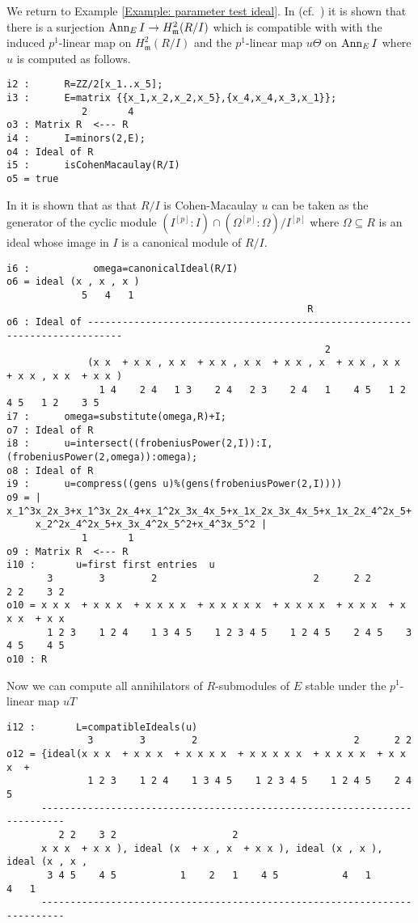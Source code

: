 \documentclass[11pt]{amsart}
\begin{document}
\begin{example}

We return to Example \ref{Example: parameter test ideal}.
In (cf.~\cite[\S 9]{KatzmanParameterTestIdealOfCMRings}) it is shown that
there is a surjection $\operatorname{{Ann}}_E I \rightarrow H^2_{\mathfrak{m}} (R/I)$
which is compatible with with the induced $p^1$-linear map on $H^2_{\mathfrak{m}} (R/I)$
and the $p^1$-linear map $u \Theta$ on $\operatorname{{Ann}}_E I$ where $u$ is computed as follows.
\begin{verbatim}
i2 :      R=ZZ/2[x_1..x_5];
i3 :      E=matrix {{x_1,x_2,x_2,x_5},{x_4,x_4,x_3,x_1}};
             2       4
o3 : Matrix R  <--- R
i4 :      I=minors(2,E);
o4 : Ideal of R
i5 :      isCohenMacaulay(R/I)
o5 = true
\end{verbatim}

In \cite{KatzmanParameterTestIdealOfCMRings} it is shown that as that $R/I$ is Cohen-Macaulay $u$
can be taken as the generator of the cyclic module $(I^{[p]}:I) \cap (\Omega^{[p]}:\Omega)/I^{[p]}$
where $\Omega \subseteq R$ is an ideal whose image in $I$ is a canonical module of $R/I$.


\begin{verbatim}
i6 :           omega=canonicalIdeal(R/I)
o6 = ideal (x , x , x )
             5   4   1
                                                    R
o6 : Ideal of ----------------------------------------------------------------------------
                                                       2
              (x x  + x x , x x  + x x , x x  + x x , x  + x x , x x  + x x , x x  + x x )
                1 4    2 4   1 3    2 4   2 3    2 4   1    4 5   1 2    4 5   1 2    3 5
i7 :      omega=substitute(omega,R)+I;
o7 : Ideal of R
i8 :      u=intersect((frobeniusPower(2,I)):I,(frobeniusPower(2,omega)):omega);
o8 : Ideal of R
i9 :      u=compress((gens u)%(gens(frobeniusPower(2,I))))
o9 = | x_1^3x_2x_3+x_1^3x_2x_4+x_1^2x_3x_4x_5+x_1x_2x_3x_4x_5+x_1x_2x_4^2x_5+
     x_2^2x_4^2x_5+x_3x_4^2x_5^2+x_4^3x_5^2 |
             1       1
o9 : Matrix R  <--- R
i10 :       u=first first entries  u
       3        3        2                           2      2 2        2 2    3 2
o10 = x x x  + x x x  + x x x x  + x x x x x  + x x x x  + x x x  + x x x  + x x
       1 2 3    1 2 4    1 3 4 5    1 2 3 4 5    1 2 4 5    2 4 5    3 4 5    4 5
o10 : R
\end{verbatim}
Now we can compute all annihilators of $R$-submodules of $E$ stable under the $p^1$-linear map $uT$
\begin{verbatim}
i12 :       L=compatibleIdeals(u)
              3        3        2                           2      2 2
o12 = {ideal(x x x  + x x x  + x x x x  + x x x x x  + x x x x  + x x x  +
              1 2 3    1 2 4    1 3 4 5    1 2 3 4 5    1 2 4 5    2 4 5
      --------------------------------------------------------------------------
         2 2    3 2                    2
      x x x  + x x ), ideal (x  + x , x  + x x ), ideal (x , x ), ideal (x , x ,
       3 4 5    4 5           1    2   1    4 5           4   1           4   1
      --------------------------------------------------------------------------


\end{verbatim}
\end{example}
\end{document}
